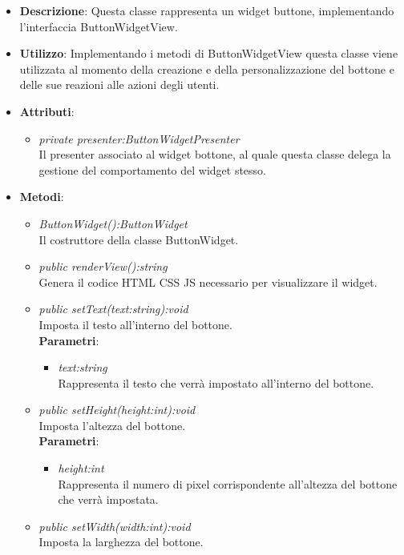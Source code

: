 \begin{itemize}
\item \textbf{Descrizione}: Questa classe rappresenta un widget buttone, implementando l'interfaccia ButtonWidgetView.
\item \textbf{Utilizzo}: Implementando i metodi di ButtonWidgetView questa classe viene utilizzata al momento della creazione e della personalizzazione del bottone e delle sue reazioni alle azioni degli utenti.
\item \textbf{Attributi}: 
	\begin{itemize}
	\item \textit{private presenter:ButtonWidgetPresenter}\\
	Il presenter associato al widget bottone, al quale questa classe delega la gestione del comportamento del widget stesso.
	\end{itemize}
\item \textbf{Metodi}:
	\begin{itemize}
	\item \textit{ButtonWidget():ButtonWidget}\\
	Il costruttore della classe ButtonWidget.
	\item \textit{public renderView():string}\\
	 Genera il codice HTML CSS JS necessario per visualizzare il widget.
	\item \textit{public setText(text:string):void}\\
	Imposta il testo all'interno del bottone.
		\\ \textbf{Parametri}: \begin{itemize}
		\item \textit{text:string}\\
		Rappresenta il testo che verrà impostato all'interno del bottone.
		\end{itemize}
	\item \textit{public setHeight(height:int):void}\\
	Imposta l'altezza del bottone.
		\\ \textbf{Parametri}: \begin{itemize}
		\item \textit{height:int}\\
		Rappresenta il numero di pixel corrispondente all'altezza del bottone che verrà impostata.
		\end{itemize}
	\item \textit{public setWidth(width:int):void}\\
	Imposta la larghezza del bottone.

\end{itemize}
\end{itemize}

